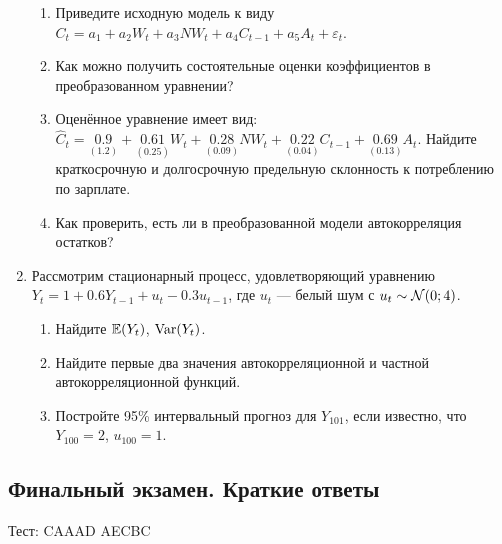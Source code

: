 \begin{enumerate}
\begin{enumerate}
	\item Приведите исходную модель к виду $C_t = a_1 + a_2 W_t + a_3 NW_t + a_4 C_{t-1} + a_5 A_t + \varepsilon_t$.
	\item Как можно получить состоятельные оценки коэффициентов в преобразованном уравнении?
	\item Оценённое уравнение имеет вид:
	$\hat C_t = \underset{(1.2)}{0.9} + \underset{(0.25)}{0.61}W_t + \underset{(0.09)}{0.28}NW_t + \underset{(0.04)}{0.22}C_{t-1} + \underset{(0.13)}{0.69}A_t$.
	Найдите краткосрочную и долгосрочную предельную склонность к потреблению по зарплате. 
	\item Как проверить, есть ли в преобразованной модели автокорреляция остатков?
\end{enumerate}

\item Рассмотрим стационарный процесс, удовлетворяющий уравнению $Y_t = 1 + 0.6Y_{t-1} + u_t - 0.3 u_{t-1}$, 
где $u_t$ — белый шум с $u_t \sim \mathcal{N}(0; 4)$.

\begin{enumerate}
	\item Найдите $\operatorname{\mathbb{E}}(Y_t)$, $\operatorname{Var}(Y_t)$.
	\item Найдите первые два значения автокорреляционной и частной автокорреляционной функций.
	\item Постройте 95\% интервальный прогноз для $Y_{101}$, если известно, что $Y_{100} = 2$, $u_{100}=1$.
\end{enumerate}

\end{enumerate}

\subsection{Финальный экзамен. Краткие ответы}

Тест: CAAAD AECBC

